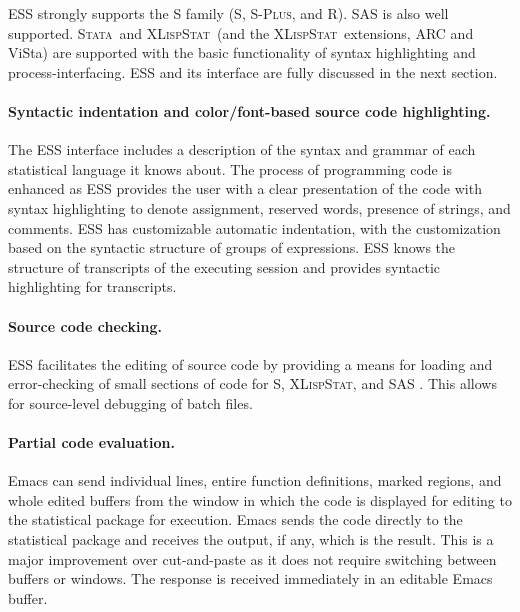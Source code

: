 \documentclass{article}
\newcommand*{\SAS}{\textsc{SAS}{\textregistered} }
\newcommand*{\Splus}{\textsc{S-Plus}}
\newcommand*{\XLispStat}{\textsc{XLispStat}}
\newcommand*{\Stata}{\textsc{Stata}}
\begin{document}
ESS strongly supports the S family (S, \Splus, and R).  
\SAS is also well supported.  \Stata\ 
and \XLispStat\ (and the \XLispStat\ extensions, ARC and ViSta) are
supported with the basic functionality of syntax highlighting and
process-interfacing.  ESS and its interface are fully discussed in the
next section.


\paragraph{Syntactic indentation and color/font-based source code
  highlighting.}  The ESS interface includes a description of the
syntax and grammar of each statistical language it knows about.
The process of programming code is enhanced as ESS provides the user with
a clear presentation of the code with syntax highlighting to denote
assignment, reserved words, presence of strings, and comments.  ESS
has customizable automatic indentation, with the customization based
on the syntactic structure of groups of expressions.  ESS knows the
structure of transcripts of the executing session and provides
syntactic highlighting for transcripts.  

\paragraph{Source code checking.}
ESS facilitates the editing of source code by providing a means for
loading and error-checking of small sections of code for S,
\XLispStat, and \SAS.  This allows for source-level debugging of batch
files.

\paragraph{Partial code evaluation.}
Emacs can send individual lines, entire function definitions, marked
regions, and whole edited buffers from the window in which the code is
displayed for editing to the statistical package for
execution.  Emacs sends the code directly to
the statistical package and receives the output, if any, which is 
the result.  This is a major improvement over cut-and-paste as it does
not require switching between buffers or windows.  The response is received
immediately in an editable Emacs buffer.
\end{document}
